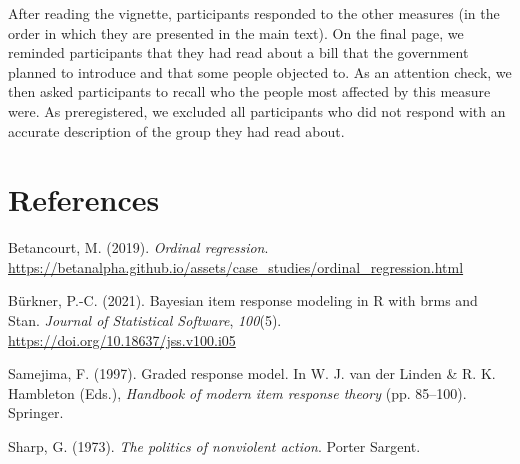 \documentclass[12pt, letterpaper]{article}
\newenvironment{CSLReferences}[2]{}{}
\begin{document}
After reading the vignette, participants responded to the other measures
(in the order in which they are presented in the main text). On the
final page, we reminded participants that they had read about a bill
that the government planned to introduce and that some people objected
to. As an attention check, we then asked participants to recall who the
people most affected by this measure were. As preregistered, we excluded
all participants who did not respond with an accurate description of the
group they had read about.

\newpage

\hypertarget{references}{%
\section{References}\label{references}}

\begingroup

\noindent \setlength{\parindent}{-0.5in} \setlength{\leftskip}{0.5in}

\hypertarget{refs}{}
\begin{CSLReferences}{1}{0}
\leavevmode{}%
Betancourt, M. (2019). \emph{Ordinal regression}.
\url{https://betanalpha.github.io/assets/case_studies/ordinal_regression.html}

\leavevmode{}%
Bürkner, P.-C. (2021). Bayesian item response modeling in {R} with brms
and {Stan}. \emph{Journal of Statistical Software}, \emph{100}(5).
\url{https://doi.org/10.18637/jss.v100.i05}

\leavevmode{}%
Samejima, F. (1997). Graded response model. In W. J. van der Linden \&
R. K. Hambleton (Eds.), \emph{Handbook of modern item response theory}
(pp. 85--100). Springer.

\leavevmode{}%
Sharp, G. (1973). \emph{The politics of nonviolent action}. Porter
Sargent.

\end{CSLReferences}

\endgroup

\newpage
\end{document}
